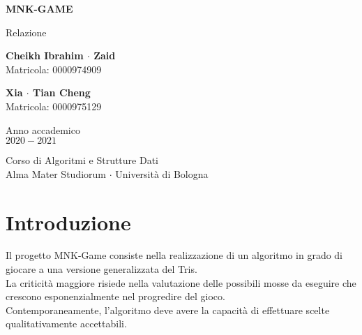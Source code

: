 \documentclass[11pt]{article}
\begin{document}
\begin{titlepage}
    \begin{center}
        \vspace*{1.5cm}
            
        \Huge
        \textbf{MNK-GAME}
            
        \vspace{0.5cm}
        \LARGE
        Relazione
            
        \vspace{1.5cm}
          
        \begin{minipage}[t]{0.47\textwidth}
        \begin{center}
        	{\large{\bf Cheikh Ibrahim $\cdot$ Zaid}}\\
			{\large Matricola: 0000974909}
        \end{center}

		\end{minipage}
		\hfill
		\begin{minipage}[t]{0.47\textwidth}\raggedleft
		\begin{center}
        	{\large{\bf Xia $\cdot$ Tian Cheng}}\\
			{\large Matricola: 0000975129}
        \end{center}
		\end{minipage}  
            
        \vspace{6cm}
            
        Anno accademico\\
        $2020 - 2021$
            
        \vspace{0.8cm}
            
            
        \Large
        Corso di Algoritmi e Strutture Dati\\
        Alma Mater Studiorum $\cdot$ Università di Bologna\\
            
    \end{center}
\end{titlepage}
\pagebreak


\section{Introduzione}
\justify
Il progetto MNK-Game consiste nella realizzazione di un algoritmo in grado di giocare a una versione generalizzata del Tris.\\
La criticità maggiore risiede nella valutazione delle possibili mosse da eseguire che crescono esponenzialmente nel progredire del gioco.\\
Contemporaneamente, l'algoritmo deve avere la capacità di effettuare scelte qualitativamente accettabili.
\end{document}
